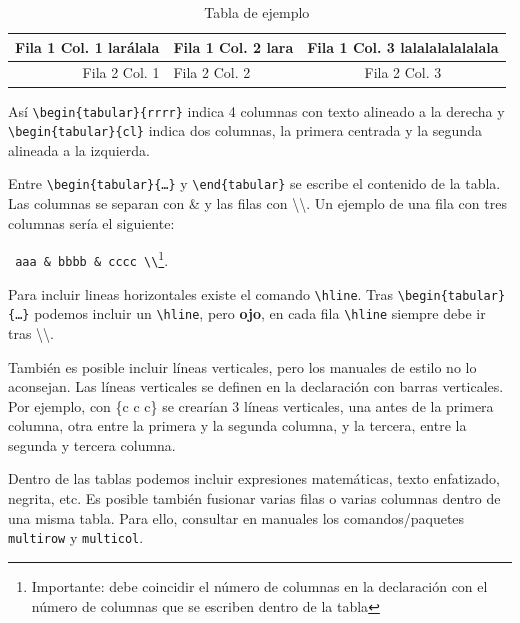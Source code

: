 \begin{table}[htp]
\caption{Tabla de ejemplo}
\label{tab:tabla_ejemplo}
\begin{center}
 \begin{tabular}{rlc}\hline
  Fila 1 Col. 1 larálala & Fila 1 Col. 2 lara & Fila 1 Col. 3  lalalalalalalala\\ \hline
  Fila 2 Col. 1 & Fila 2 Col. 2 & Fila 2 Col. 3 \\ \hline
 \end{tabular}
\end{center}
\end{table}

Así \texttt{\textbackslash begin\{tabular\}\{rrrr\}} indica 4 columnas con texto alineado a la derecha y \texttt{\textbackslash begin\{tabular\}\{cl\}} indica dos columnas, la primera centrada y la segunda alineada a la izquierda.

Entre \texttt{\textbackslash begin\{tabular\}\{\ldots\}} y \texttt{\textbackslash end\{tabular\}} se escribe el contenido de la tabla. Las columnas se separan con \& y las filas con \textbackslash \textbackslash. Un ejemplo de una fila con tres columnas sería el siguiente:
\begin{center}
 \texttt{ aaa \& bbbb \& cccc \textbackslash \textbackslash}\footnote{Importante: debe coincidir el número de columnas en la declaración con el número de columnas que se escriben dentro de la tabla}. 
\end{center}

Para incluir lineas horizontales existe el comando \texttt{\textbackslash hline}. Tras \texttt{\textbackslash begin\{tabular\}\{\ldots\}} podemos incluir un \texttt{\textbackslash hline}, pero \textbf{ojo}, en cada fila \texttt{\textbackslash hline} siempre debe ir tras \textbackslash \textbackslash.

También es posible incluir líneas verticales, pero los manuales de estilo no lo aconsejan. Las líneas verticales se definen en la declaración con barras verticales. Por ejemplo, con \{\textbar c  \textbar c \textbar c\}  se crearían 3 líneas verticales, una antes de la primera columna, otra entre la primera y la segunda columna, y la tercera, entre la segunda y tercera columna.

Dentro de las tablas podemos incluir expresiones matemáticas, texto enfatizado, negrita, etc. Es posible también fusionar varias filas o varias columnas dentro de una misma tabla. Para ello, consultar en manuales los comandos/paquetes \texttt{multirow} y \texttt{multicol}.


